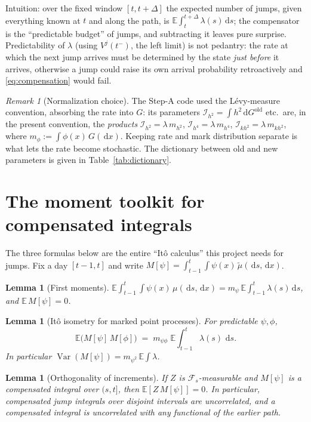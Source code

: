 \documentclass[11pt]{report}
\newtheorem{lemma}[theorem]{Lemma}
\theoremstyle{definition}
\theoremstyle{remark}
\newtheorem{remark}[theorem]{Remark}
\newcommand{\E}{\mathbb{E}}
\newcommand{\Var}{\operatorname{Var}}
\newcommand{\F}{\mathcal{F}}
\newcommand{\dd}{\,\mathrm{d}}
\newcommand{\Vj}{V^{j}}
\newcommand{\mh}{m_{h^{2}}}
\newcommand{\mhh}{m_{h^{4}}}
\newcommand{\mkh}{m_{kh^{2}}}
\begin{document}
Intuition: over the fixed window $[t,t+\Delta]$ the expected number of jumps,
given everything known at $t$ and along the path, is
$\E\int_{t}^{t+\Delta}\lambda(s)\dd s$; the compensator is the
``predictable budget'' of jumps, and subtracting it leaves pure surprise.
Predictability of $\lambda$ (using $\Vj(t^-)$, the left limit) is not
pedantry: the rate at which the next jump arrives must be determined by the
state \emph{just before} it arrives, otherwise a jump could raise its own
arrival probability retroactively and \eqref{eq:compensation} would fail.

\begin{remark}[Normalization choice]\label{rem:normalization}
The Step-A code used the L\'evy-measure convention, absorbing the rate into
$G$: its parameters $\mathcal{I}_{h^2}=\int h^2\dd G^{\text{old}}$ etc.\ are,
in the present convention, the \emph{products}
$\mathcal{I}_{h^2}=\lambda\,\mh$, $\mathcal{I}_{h^4}=\lambda\,\mhh$,
$\mathcal{I}_{kh^2}=\lambda\,\mkh$, where
$m_{\phi}:=\int\phi(x)\,G(\dd x)$. Keeping rate and mark distribution
separate is what lets the rate become stochastic. The dictionary between old
and new parameters is given in Table~\ref{tab:dictionary}.
\end{remark}

\section{The moment toolkit for compensated integrals}

The three formulas below are the entire ``It\^o calculus'' this project needs
for jumps. Fix a day $[t-1,t]$ and write
$M[\psi]=\int_{t-1}^{t}\!\int\psi(x)\,\tilde\mu(\dd s,\dd x)$.

\begin{lemma}[First moments]\label{lem:firstmoment}
$\displaystyle \E\int_{t-1}^{t}\!\!\int\psi(x)\,\mu(\dd s,\dd x)
= m_{\psi}\,\E\!\int_{t-1}^{t}\lambda(s)\dd s$, and $\E\,M[\psi]=0$.
\end{lemma}

\begin{lemma}[It\^o isometry for marked point processes]\label{lem:isometry}
For predictable $\psi,\phi$,
\[
\E\big(M[\psi]\,M[\phi]\big)
\;=\; m_{\psi\phi}\;\E\!\int_{t-1}^{t}\lambda(s)\,\dd s .
\]
In particular $\Var(M[\psi]) = m_{\psi^{2}}\,\E\int\lambda$.
\end{lemma}

\begin{lemma}[Orthogonality of increments]\label{lem:orthogonality}
If $Z$ is $\F_{s}$-measurable and $M[\psi]$ is a compensated integral over
$(s,t]$, then $\E[Z\,M[\psi]]=0$. In particular, compensated jump integrals
over \emph{disjoint} intervals are uncorrelated, and a compensated integral is
uncorrelated with any functional of the \emph{earlier} path.
\end{lemma}
\end{document}
